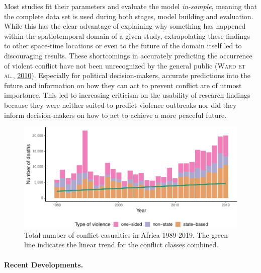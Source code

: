 \documentclass[a4paper,11pt]{article}
\begin{document}
Most studies fit their parameters and evaluate the model \emph{in-sample}, meaning that
the complete data set is used during both stages,
model building and evaluation. While this has the clear advantage of explaining
why something has happened within the spatiotemporal domain of a given study,
extrapolating these findings to other space-time locations or even to the future
of the domain itself led to discouraging results. These shortcomings in accurately
predicting the occurrence of violent conflict have not been unrecognized by the
general public \textsc{(\textnormal{\textsc{Ward} \textsc{et al.}}, \textnormal{\protect\hyperlink{ref-ward2010}{2010}})}. Especially for political decision-makers, accurate
predictions into the future and information on how they can act to prevent conflict
are of utmost importance. This led to increasing criticism on the usability of
research findings because they were neither suited to predict violence outbreaks
nor did they inform decision-makers on how to act to achieve a more peaceful future.
\begin{figure}[H]

{\centering \includegraphics{thesis_files/figure-latex/01-intro-conflicts-1} 

}

\caption[Total number of conflict casualties in Africa 1989-2019.]{Total number of conflict casualties in Africa 1989-2019. The green line indicates the linear trend for the conflict classes combined.}\label{fig:01-intro-conflicts}
\end{figure}
\hypertarget{recent-developments.}{%
\paragraph{Recent Developments.}\label{recent-developments.}}
\end{document}
